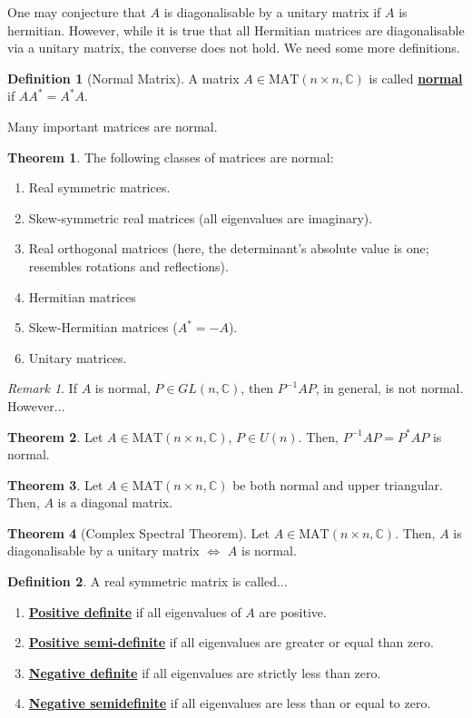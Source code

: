 \documentclass[11pt]{scrartcl}
\theoremstyle{definition}
\newtheorem{theorem}{Theorem}
\newtheorem{definition}{Definition}
\theoremstyle{remark}
\newtheorem*{remark}{Remark}
\newcommand{\dfn}[1]{\textbf{\underline{#1}}}
\newcommand{\C}[0]{\mathbb{C}}
\newcommand{\matn}[1]{\text{MAT}(n\times n, \mathbb{#1})}
\begin{document}
One may conjecture that $A$ is diagonalisable by a unitary matrix if $A$ is hermitian. However, while it is true that all Hermitian matrices are diagonalisable via a unitary matrix, the converse does not hold. We need some more definitions. 


\begin{definition}[Normal Matrix]
	A matrix $A \in \matn{C}$ is called \dfn{normal} if $AA^* = A^* A$. 
\end{definition}
Many important matrices are normal. 
\begin{theorem}
	The following classes of matrices are normal: 
	\begin{enumerate}[noitemsep]
		\item Real symmetric matrices. 
		\item Skew-symmetric real matrices (all eigenvalues are imaginary). 
		\item Real orthogonal matrices (here, the determinant's absolute value is one; resembles rotations and reflections). 
		\item Hermitian matrices 
		\item Skew-Hermitian matrices ($A^* = -A$). 
		\item Unitary matrices.
	\end{enumerate}
\end{theorem}


\begin{remark}
	If $A$ is normal, $P \in GL(n, \C)$, then $P^{-1}AP$, in general, is not normal. However...
\end{remark}

\begin{theorem}
	Let $A \in \matn{C}$, $P \in U(n)$. Then, $P^{-1}AP = P^*AP$ is normal. 
\end{theorem}

\begin{theorem}
	Let $A \in \matn{C}$ be both normal and upper triangular. Then, $A$ is a diagonal matrix. 
\end{theorem}

\begin{theorem}[Complex Spectral Theorem]
	Let $A \in \matn{C}$. Then, $A$ is diagonalisable by a unitary matrix $\iff$ $A$ is normal. 
\end{theorem}

\begin{definition}
	A real symmetric matrix is called...
	\begin{enumerate}[noitemsep]
		\item \dfn{Positive definite} if all eigenvalues of $A$ are positive. 
		\item \dfn{Positive semi-definite} if all eigenvalues are greater or equal than zero. 
		\item \dfn{Negative definite} if all eigenvalues are strictly less than zero. 
		\item \dfn{Negative semidefinite} if all eigenvalues are less than or equal to zero. 
	\end{enumerate}
\end{definition}
\end{document}

